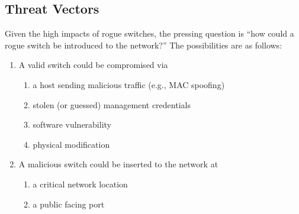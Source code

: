 \documentclass[journal]{IEEEtran}
\begin{document}
\subsection{Threat Vectors}
Given the high impacts of rogue switches, the pressing question is ``how could a rogue switch be
introduced to the network?'' The possibilities are as follows:
\begin{enumerate}
  \item A valid switch could be compromised via
  \begin{enumerate}
    \item a host sending malicious traffic (e.g., MAC spoofing)
    \item stolen (or guessed) management credentials
    \item software vulnerability
    \item physical modification
  \end{enumerate}
  \item A malicious switch could be inserted to the network at
  \begin{enumerate}
    \item a critical network location
    \item a public facing port
  \end{enumerate}
\end{enumerate}
\end{document}

